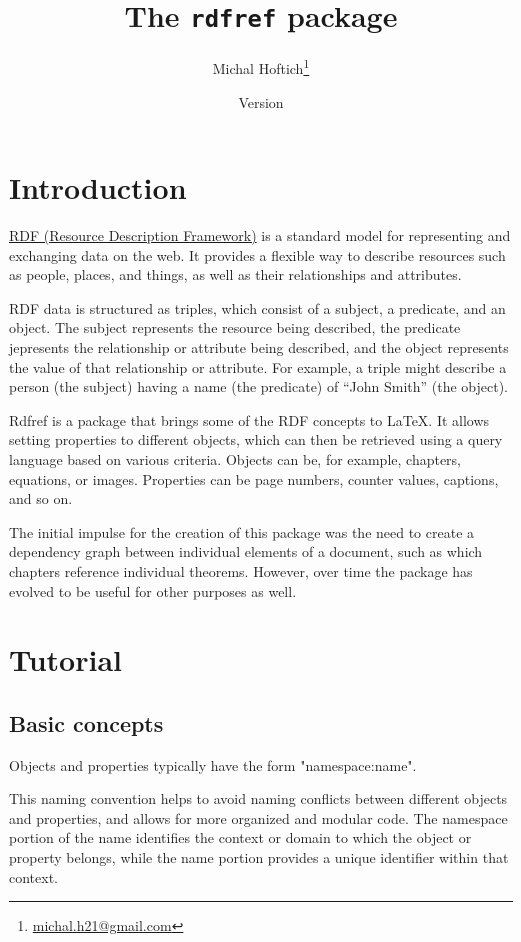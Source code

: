 \documentclass{ltxdoc}
\title{The \texttt{rdfref} package}
\author{Michal Hoftich\footnote{\href{mailto:michal.h21@gmail.com}{michal.h21@gmail.com}}}
\date{Version \version\\\gitdate}
\begin{document}
\maketitle
\tableofcontents

\section{Introduction}

\href{https://en.wikipedia.org/wiki/Resource_Description_Framework}{RDF (Resource Description Framework)}
is a standard model for representing and
exchanging data on the web. It provides a flexible way to describe resources
such as people, places, and things, as well as their relationships and
attributes.

RDF data is structured as triples, which consist of a subject, a predicate, and
an object. The subject represents the resource being described, the predicate
jepresents the relationship or attribute being described, and the object
represents the value of that relationship or attribute. For example, a triple
might describe a person (the subject) having a name (the predicate) of \enquote{John
Smith} (the object).

Rdfref is a package that brings some of the RDF concepts to \LaTeX. It allows
setting properties to different objects, which can then be retrieved using a
query language based on various criteria. Objects can be, for example,
chapters, equations, or images. Properties can be page numbers, counter values,
captions, and so on.

The initial impulse for the creation of this package was the need to create a
dependency graph between individual elements of a document, such as which
chapters reference individual theorems. However, over time the package has
evolved to be useful for other purposes as well.

\section{Tutorial}


\subsection{Basic concepts}

Objects and properties typically have the form "namespace:name".

This naming convention helps to avoid naming conflicts between different
objects and properties, and allows for more organized and modular code. The
namespace portion of the name identifies the context or domain to which the
object or property belongs, while the name portion provides a unique identifier
within that context.
\end{document}
